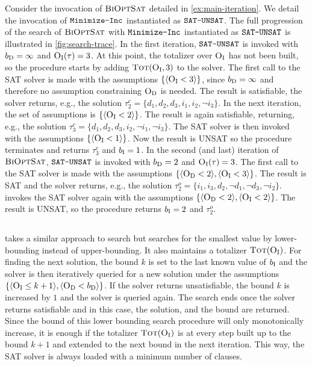 \begin{example}\label{ex:satunsat}
  Consider the invocation of $\textsc{BiOptSat}$ detailed in \cref{ex:main-iteration}. 
  We detail the invocation of $\texttt{Minimize-\allowbreak{}Inc}$ instantiated as $\texttt{SAT-\allowbreak{}UNSAT}$. 
  The full progression of the search of $\textsc{BiOptSat}$ with $\texttt{Minimize-\allowbreak{}Inc}$ instantiated as $\texttt{SAT-\allowbreak{}UNSAT}$ is illustrated in \cref{fig:search-trace}.
  In the first iteration, $\texttt{SAT-\allowbreak{}UNSAT}$ is invoked with $b_{\text{D}} =\infty$ and $\textsc{O}_{\text{I}}(\tau) = 3$.
  At this point, the totalizer over $\textsc{O}_{\text{I}}$ has not been built, so the procedure starts by adding $\textsc{Tot}(\textsc{O}_{\text{I}}, 3)$ to the solver.
  The first call to the SAT solver is made with the assumptions $\{\langle \textsc{O}_{\text{I}} < 3 \rangle\}$, since $b_{\text{D}}  = \infty$ and therefore no assumption constraining $\textsc{O}_{\text{D}}$ is needed.
  The result is satisfiable, the solver returns, e.g., the solution $\tau^c_2 = \{d_1, d_2, d_3, i_1, i_2, \lnot i_3\}$. 
  In the next iteration, the set of assumptions is $\{\langle \textsc{O}_{\text{I}} < 2 \rangle\}$.
  The result is again satisfiable, returning, e.g., the solution $\tau^c_3 = \{ d_1,  d_2, d_3, i_2, \lnot i_1, \lnot i_3\}$.
  The SAT solver is then invoked with the assumptions  $\{\langle \textsc{O}_{\text{I}} < 1 \rangle\}$.
  Now the result is UNSAT so the procedure terminates and returns $\tau^c_3$ and $b_{\text{I}} = 1$. 
  In the second (and last) iteration of $\textsc{BiOptSat}$, $\texttt{SAT-\allowbreak{}UNSAT}$ is invoked with $b_{\text{D}} = 2$ and $\textsc{O}_{\text{I}}(\tau) = 3$.
  The first call to the SAT solver is made with the assumptions $\{ \langle \textsc{O}_{\text{D}} < 2 \rangle, \langle \textsc{O}_{\text{I}} < 3 \rangle\}$.
  The result is SAT and the solver returns, e.g., the solution $\tau^o_2 = \{ i_1, i_3, d_2, \lnot d_1, \lnot d_3, \lnot i_2 \}$.
  \satunsat{} invokes the SAT solver again with the assumptions $\{ \langle \textsc{O}_{\text{D}} < 2 \rangle, \langle \textsc{O}_{\text{I}} < 2 \rangle \}$.
  The result is UNSAT, so the procedure returns $b_{\text{I}} = 2$ and $\tau^o_2$.
\end{example}

\subsection{\unsatsat{}\label{sec:unsat-sat}}

\unsatsat{} takes a similar approach to \satunsat{} search but searches for the smallest value by lower-bounding instead of upper-bounding.
It also maintains a totalizer $\textsc{Tot}(\textsc{O}_{\text{I}})$.
For finding the next solution, the bound $k$ is set to the last known value of $b_{\text{I}}$ and the solver is then iteratively queried for a new solution under the assumptions $\{ \langle \textsc{O}_{\text{I}} \leq k+1 \rangle, \langle \textsc{O}_{\text{D}} < b_{\text{D}} \rangle \}$.
If the solver returns unsatisfiable, the bound $k$ is increased by $1$ and the solver is queried again.
The search ends once the solver returns satisfiable and in this case, the solution, and the bound are returned.
Since the bound of this lower bounding search procedure will only monotonically increase, it is enough if the totalizer $\textsc{Tot}(\textsc{O}_{\text{I}})$ is at every step built up to the bound $k+1$ and extended to the next bound in the next iteration.
This way, the SAT solver is always loaded with a minimum number of clauses.


